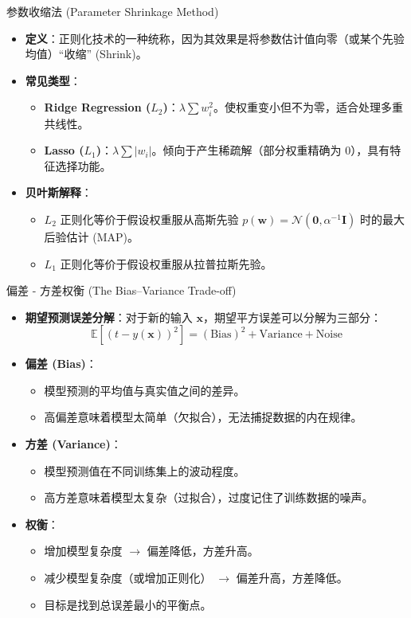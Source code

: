 \documentclass[12pt, aspectratio=169]{beamer}
\newcommand{\vect}[1]{\mathbf{#1}}
\newcommand{\mat}[1]{\mathbf{#1}}
\newcommand{\E}{\mathbb{E}}
\newcommand{\N}{\mathcal{N}}
\begin{document}
\begin{frame}{参数收缩法 (Parameter Shrinkage Method)}
    \begin{itemize}
        \item \textbf{定义}：正则化技术的一种统称，因为其效果是将参数估计值向零（或某个先验均值）“收缩” (Shrink)。
        \item \textbf{常见类型}：
        \begin{itemize}
            \item \textbf{Ridge Regression ($L_2$)}：$\lambda \sum w_i^2$。使权重变小但不为零，适合处理多重共线性。
            \item \textbf{Lasso ($L_1$)}：$\lambda \sum |w_i|$。倾向于产生稀疏解（部分权重精确为 0），具有特征选择功能。
        \end{itemize}
        \item \textbf{贝叶斯解释}：
        \begin{itemize}
            \item $L_2$ 正则化等价于假设权重服从高斯先验 $p(\vect{w}) = \N(\vect{0}, \alpha^{-1}\mat{I})$ 时的最大后验估计 (MAP)。
            \item $L_1$ 正则化等价于假设权重服从拉普拉斯先验。
        \end{itemize}
    \end{itemize}
\end{frame}

\begin{frame}{偏差 - 方差权衡 (The Bias–Variance Trade-off)}
    \begin{itemize}
        \item \textbf{期望预测误差分解}：对于新的输入 $\vect{x}$，期望平方误差可以分解为三部分：
        $$ \E[(t - y(\vect{x}))^2] = (\text{Bias})^2 + \text{Variance} + \text{Noise} $$
        \item \textbf{偏差 (Bias)}：
        \begin{itemize}
            \item 模型预测的平均值与真实值之间的差异。
            \item 高偏差意味着模型太简单（欠拟合），无法捕捉数据的内在规律。
        \end{itemize}
        \item \textbf{方差 (Variance)}：
        \begin{itemize}
            \item 模型预测值在不同训练集上的波动程度。
            \item 高方差意味着模型太复杂（过拟合），过度记住了训练数据的噪声。
        \end{itemize}
        \item \textbf{权衡}：
        \begin{itemize}
            \item 增加模型复杂度 $\to$ 偏差降低，方差升高。
            \item 减少模型复杂度（或增加正则化） $\to$ 偏差升高，方差降低。
            \item 目标是找到总误差最小的平衡点。
        \end{itemize}
    \end{itemize}
\end{frame}
\end{document}
